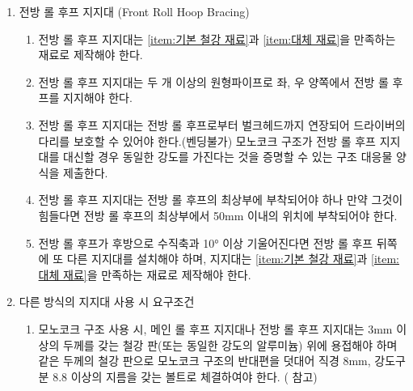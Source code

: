 \documentclass[final,a4paper,10pt]{report}
\begin{document}
\begin{enumerate}
  \item\label{rule:formula-technical.roll-hoop-bracing.front-hoop-bracing} 전방 롤 후프 지지대 (Front Roll Hoop Bracing) \label{item:전방 롤 후프 지지대}
    \begin{enumerate}
      \item\label{rule:formula-technical.roll-hoop-bracing.front-hoop-bracing.material-compliance} 전방 롤 후프 지지대는 \ref{item:기본 철강 재료}과 \ref{item:대체 재료}을 만족하는 재료로 제작해야 한다.
      \item\label{rule:formula-technical.roll-hoop-bracing.front-hoop-bracing.min-2tubes-both-sides} 전방 롤 후프 지지대는 두 개 이상의 원형파이프로 좌, 우 양쪽에서 전방 롤 후프를 지지해야 한다.
      \item\label{rule:formula-technical.roll-hoop-bracing.front-hoop-bracing.bulkhead-extension-no-bend} 전방 롤 후프 지지대는 전방 롤 후프로부터 벌크헤드까지 연장되어 드라이버의 다리를 보호할 수 있어야 한다.(벤딩불가) 모노코크 구조가 전방 롤 후프 지지대를 대신할 경우 동일한 강도를 가진다는 것을 증명할 수 있는 구조 대응물 양식을 제출한다.
      \item\label{rule:formula-technical.roll-hoop-bracing.front-hoop-bracing.attachment-point-50mm} 전방 롤 후프 지지대는 전방 롤 후프의 최상부에 부착되어야 하나 만약 그것이 힘들다면 전방 롤 후프의 최상부에서 50mm 이내의 위치에 부착되어야 한다.
      \item\label{rule:formula-technical.roll-hoop-bracing.front-hoop-bracing.extra-brace-past-10deg} 전방 롤 후프가 후방으로 수직축과 10° 이상 기울어진다면 전방 롤 후프 뒤쪽에 또 다른 지지대를 설치해야 하며, 지지대는 \ref{item:기본 철강 재료}과 \ref{item:대체 재료}을 만족하는 재료로 제작해야 한다.
    \end{enumerate}

  \item\label{rule:formula-technical.roll-hoop-bracing.alternatives} 다른 방식의 지지대 사용 시 요구조건
    \begin{enumerate}
      \item\label{rule:formula-technical.roll-hoop-bracing.alternatives.monocoque-plate-8mm-bolt} 모노코크 구조 사용 시, 메인 롤 후프 지지대나 전방 롤 후프 지지대는 3mm 이상의 두께를 갖는 철강 판(또는 동일한 강도의 알루미늄) 위에 용접해야 하며 같은 두께의 철강 판으로 모노코크 구조의 반대편을 덧대어 직경 8mm, 강도구분 8.8 이상의 지름을 갖는 볼트로 체결하여야 한다. ( 참고) \label{item:모노코크 지지대 접합부}



\end{enumerate}
\end{enumerate}
\end{document}
